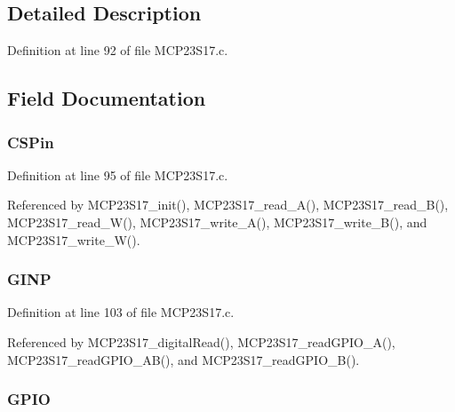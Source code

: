\subsection{Detailed Description}


Definition at line 92 of file M\-C\-P23\-S17.\-c.



\subsection{Field Documentation}
\hypertarget{structtag_m_c_p23_s17_a09f926ede0f907462cd9c4aa33d14c39}{
\subsubsection[{C\-S\-Pin}]{ C\-S\-Pin}}\label{structtag_m_c_p23_s17_a09f926ede0f907462cd9c4aa33d14c39}


Definition at line 95 of file M\-C\-P23\-S17.\-c.



Referenced by M\-C\-P23\-S17\-\_\-init(), M\-C\-P23\-S17\-\_\-read\-\_\-\-A(), M\-C\-P23\-S17\-\_\-read\-\_\-\-B(), M\-C\-P23\-S17\-\_\-read\-\_\-\-W(), M\-C\-P23\-S17\-\_\-write\-\_\-\-A(), M\-C\-P23\-S17\-\_\-write\-\_\-\-B(), and M\-C\-P23\-S17\-\_\-write\-\_\-\-W().

\hypertarget{structtag_m_c_p23_s17_a611b6d537907e7d9a6389f430095f879}{
\subsubsection[{G\-I\-N\-P}]{ G\-I\-N\-P}}\label{structtag_m_c_p23_s17_a611b6d537907e7d9a6389f430095f879}


Definition at line 103 of file M\-C\-P23\-S17.\-c.



Referenced by M\-C\-P23\-S17\-\_\-digital\-Read(), M\-C\-P23\-S17\-\_\-read\-G\-P\-I\-O\-\_\-\-A(), M\-C\-P23\-S17\-\_\-read\-G\-P\-I\-O\-\_\-\-A\-B(), and M\-C\-P23\-S17\-\_\-read\-G\-P\-I\-O\-\_\-\-B().

\hypertarget{structtag_m_c_p23_s17_a6b49736d3a0718bbeac5e48a8d2d3ed3}{
\subsubsection[{G\-P\-I\-O}]{ G\-P\-I\-O}}\label{structtag_m_c_p23_s17_a6b49736d3a0718bbeac5e48a8d2d3ed3}



